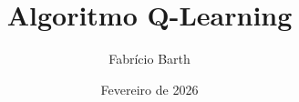 \documentclass{beamer}
\begin{document}
\title{Algoritmo Q-Learning} 
\author{Fabrício Barth}
\date{Fevereiro de 2026}

\maketitle

	
	
	
	


%	
%	
%	


%	
%	
%	
\end{document}
